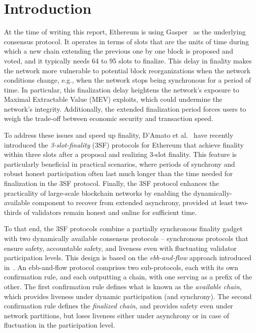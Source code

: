 
\section{Introduction}

At the time of writing this report, Ethereum is using
Gasper~\cite{buterin2020combining} as the underlying consensus protocol.
It operates in terms of slots that are the units of time 
during which a new chain extending the previous one by one block is proposed and
voted, and it typically needs 64 to 95 slots to finalize.
This delay in finality makes the network more vulnerable to potential
block reorganizations when the network conditions change, 
e.g., when the network stops being synchronous for a period of time. 
In particular, this finalization delay heightens the network’s exposure to
Maximal Extractable Value (MEV) exploits, 
which could undermine the network’s integrity.
Additionally, the extended finalization period forces users to weigh the
trade-off between economic security and transaction speed.

To address these issues and speed up finality, D’Amato et al.~\cite{d20243} have recently introduced the \emph{3-slot-finality} (3SF) protocols 
for Ethereum that achieve finality within three slots after a proposal and realizing 3-slot finality.
This feature is particularly beneficial in practical scenarios, where periods of synchrony and robust honest participation often 
last much longer than the time needed for finalization in the 3SF protocol.
Finally, the 3SF protocol enhances the practicality of large-scale blockchain networks by enabling the dynamically-available component 
to recover from extended asynchrony, provided at least two-thirds of validators remain honest and online for sufficient time. 

To that end, the 3SF protocols combine a partially synchronous finality gadget with two dynamically available consensus protocols – 
synchronous protocols that ensure safety, accountable safety, and liveness even with fluctuating validator participation levels. 
This design is based on the \emph{ebb-and-flow} approach introduced in~\cite{neu2021ebb}. 
An ebb-and-flow protocol comprises two sub-protocols, each with its own confirmation rule, and each outputting a chain, with one serving 
as a prefix of the other. 
The first confirmation rule defines what is known as the \emph{available chain}, which provides liveness under dynamic participation
(and synchrony). 
The second confirmation rule defines the \emph{finalized chain}, and provides safety even under network partitions, but loses liveness 
either under asynchrony or in case of fluctuation in the participation level.

